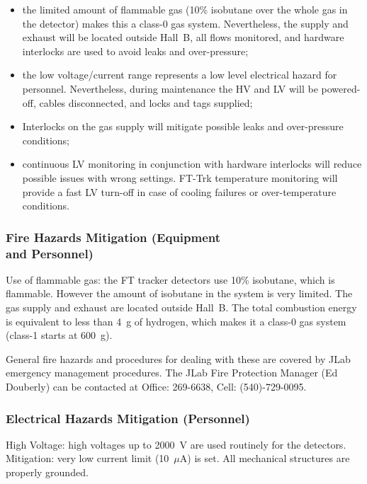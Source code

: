 \begin{itemize}
\item{ the limited amount of flammable gas (10$\%$ isobutane over the whole gas in the detector)  
makes this a class-0 gas system. Nevertheless, the supply and exhaust will be located outside 
Hall~B, all flows monitored, and hardware interlocks are used to avoid leaks and over-pressure;}
\item{ the low voltage/current range represents  a low level electrical  hazard for personnel. 
Nevertheless, during maintenance the HV and LV will be powered-off, cables disconnected, and 
locks and tags supplied; }
\item{ Interlocks on the gas supply will mitigate possible leaks and over-pressure conditions;}
\item{ continuous LV monitoring in conjunction with hardware interlocks will reduce possible 
issues with wrong settings. FT-Trk temperature monitoring will provide a fast LV turn-off in 
case of cooling failures or over-temperature conditions. }
\end{itemize}

\subsubsection{Fire Hazards Mitigation (Equipment \\and Personnel)}

Use of flammable gas: the FT tracker detectors use 10\% isobutane, which is flammable. 
However the amount of isobutane in the system is very limited. The gas supply and exhaust 
are located outside Hall~B. The total combustion energy is equivalent to less than 4~g of 
hydrogen, which makes it a class-0 gas system (class-1 starts at 600~g). 

General fire hazards and procedures for dealing with these are covered by JLab emergency 
management procedures. The JLab Fire Protection Manager (Ed Douberly) can be contacted at 
Office: 269-6638, Cell: (540)-729-0095.

\subsubsection{Electrical Hazards Mitigation (Personnel)}

High Voltage: high voltages up to 2000~V are used routinely for the detectors. Mitigation: very 
low current limit (10~$\mu$A) is set. All mechanical structures are properly grounded.

